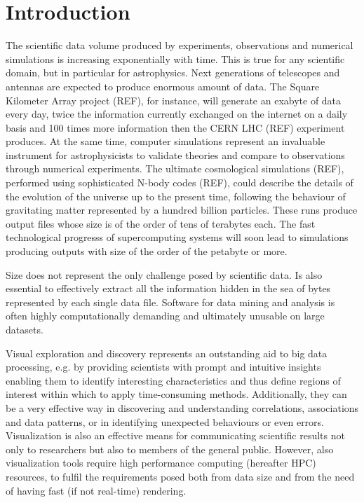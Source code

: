 \documentclass{easychair}
\begin{document}
\section{Introduction}
\label{sect:introduction}

The scientific data volume produced by experiments, observations and numerical simulations 
is increasing exponentially with time. This is true for any scientific domain, but in 
particular for astrophysics. Next generations of telescopes and antennas are expected to produce
enormous amount of data. The Square Kilometer Array project (REF), for instance, will 
generate an exabyte of data every day, twice the information currently exchanged on 
the internet on a daily basis and 100 times more information then the CERN LHC (REF) experiment
produces. At the same time, computer simulations represent an invaluable instrument for 
astrophysicists to validate theories and compare to observations through numerical experiments.
The ultimate cosmological simulations (REF), performed using sophisticated N-body codes (REF), 
could describe the details of the evolution of the universe up to the present time, following the behaviour of 
gravitating matter represented by a hundred billion particles. These runs produce output files 
whose size is of the order of tens of terabytes each. The fast technological progresss 
of supercomputing systems will soon lead to simulations producing outputs with size of the order of 
the petabyte or more. 

Size does not represent the only challenge posed by scientific data. Is also essential to 
effectively extract all the information hidden in the sea of bytes represented by each 
single data file. Software for data mining and analysis is often highly computationally
demanding and ultimately unusable on large datasets.  

Visual exploration and discovery represents an outstanding aid to big data processing, 
e.g. by providing scientists with
prompt and intuitive insights enabling them to identify interesting 
characteristics and thus define regions of interest within which to apply time-consuming 
methods. Additionally, they can be a very effective way in discovering and
understanding correlations, associations and data patterns, or in identifying unexpected behaviours
or even errors. Visualization is also an effective means for communicating scientific results not
only to researchers but also to members of the general public.
However, also visualization tools require high performance computing (hereafter HPC) resources, to 
fulfil the requirements posed both from data size and from the need of having
fast (if not real-time) rendering.
\end{document}
